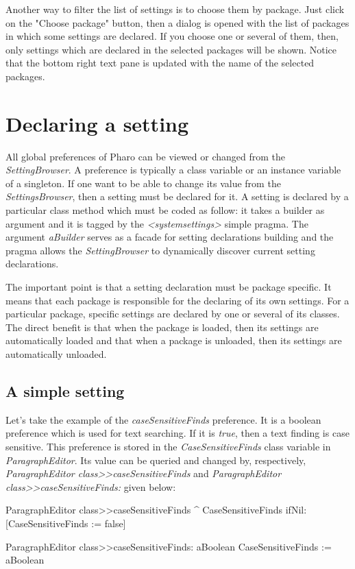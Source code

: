 \documentclass[a4paper,10pt,twoside]{book}
\begin{document}
Another way to filter the list of settings is to choose them by package. Just click on the "Choose package" button, then a dialog is opened with the list of packages in which some settings are declared. If you choose one or several of them, then, only settings which are declared in the selected packages will be shown. Notice that the bottom right text pane is updated with the name of the selected packages.


\section{Declaring a setting}
\label{sec:DeclaringASetting}
All global preferences of Pharo can be viewed or changed from the \textit{SettingBrowser}. A preference is typically a class variable or an instance variable of a singleton. If one want to be able to change its value from the \textit{SettingsBrowser}, then a setting must be declared for it.
A setting is declared by a particular class method which must be coded as follow: it takes a builder as argument and it is tagged by the \textit{<systemsettings>} simple pragma. 
The argument \textit{aBuilder} serves as a facade for setting declarations building and the pragma allows the \textit{SettingBrowser} to dynamically discover current setting declarations.

The important point is that a setting declaration must be package specific. It means that each package is responsible for the declaring of its own settings. For a particular package, specific settings are declared by one or several of its classes. The direct benefit is that when the package is loaded, then its settings are automatically loaded and that when a package is unloaded, then its settings are automatically unloaded. 

\subsection{A simple setting}
Let's take the example of the \textit{caseSensitiveFinds} preference. It is a boolean preference which is used for text searching. If it is \textit{true}, then a text finding is case sensitive. This preference is stored in the \textit{CaseSensitiveFinds} class variable in \textit{ParagraphEditor}. Its value can be queried and changed by, respectively, \textit{ParagraphEditor class>>caseSensitiveFinds} and \textit{ParagraphEditor class>>caseSensitiveFinds:} given below:
\begin{code}{}
ParagraphEditor class>>caseSensitiveFinds
	^ CaseSensitiveFinds ifNil: [CaseSensitiveFinds := false]

ParagraphEditor class>>caseSensitiveFinds: aBoolean
	CaseSensitiveFinds := aBoolean
\end{code}
\end{document}
